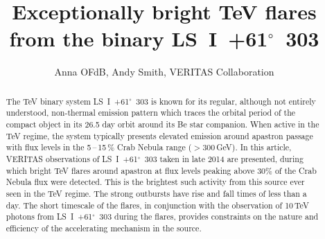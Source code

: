\documentclass[preprint2]{aastex}
\newcommand{\lsi}{LS~I~+61$^{\circ}$~303}
\newcommand{\gev}{\,GeV}
\newcommand{\tev}{\,TeV}
\begin{document}

\title{Exceptionally bright TeV flares from the binary \lsi{}}


\author{
Anna OFdB,
Andy Smith,
VERITAS Collaboration
}




\begin{abstract}
The TeV binary system \lsi{} is known for its regular, although not entirely understood, non-thermal emission pattern which traces the orbital period of the compact object in its 26.5 day orbit around its Be star companion. When active in the TeV regime, the system typically presents elevated emission around apastron passage with flux levels in the 5\,--\,15\,\% Crab Nebula range ($>300$\gev{}). In this article, VERITAS observations of \lsi{} taken in late 2014 are presented, during which bright TeV flares around apastron at flux levels peaking above $30\%$ of the Crab Nebula flux were detected. This is the brightest such activity from this source ever seen in the TeV regime. The strong outbursts have rise and fall times of less than a day. The short timescale of the flares, in conjunction with the observation of 10\tev{} photons from \lsi{} during the flares, provides constraints on the nature and efficiency of the accelerating mechanism in the source.
\end{abstract}
\end{document}
